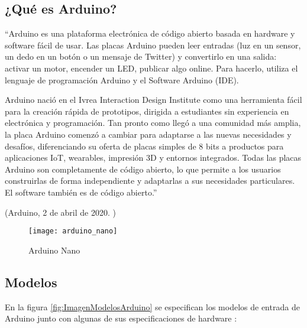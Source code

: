         \subsection{¿Qué es Arduino?} %
        \label{sub:QueEsArduino}

            ``Arduino es una plataforma electrónica de código abierto basada en hardware y software fácil de usar. Las
            placas Arduino pueden leer entradas (luz en un sensor, un dedo en un botón o un mensaje de Twitter) y
            convertirlo en una salida: activar un motor, encender un LED, publicar algo online. Para hacerlo, utiliza
            el lenguaje de programación Arduino y el Software Arduino (IDE).

            Arduino nació en el Ivrea Interaction Design Institute como una herramienta fácil para la creación rápida de
            prototipos, dirigida a estudiantes sin experiencia en electrónica y programación. Tan pronto como llegó a
            una comunidad más amplia, la placa Arduino comenzó a cambiar para adaptarse a las nuevas necesidades y
            desafíos, diferenciando su oferta de placas simples de 8 bits a productos para aplicaciones IoT, wearables,
            impresión 3D y entornos integrados. Todas las placas Arduino son completamente de código abierto, lo que
            permite a los usuarios construirlas de forma independiente y adaptarlas a sus necesidades particulares. El
            software también es de código abierto.''

            \begin{flushright}
                (Arduino, 2 de abril de 2020. \cite{arduino_introduction})
            \end{flushright}

            \begin{figure}[ht]
                \centering
                \texttt{[image: arduino\_nano]}
                \caption{Arduino Nano \cite{imagen_arduino_nano}\label{fig:ImagenArduinoNano}}
            \end{figure}


        \subsection{Modelos} %
        \label{sub:ModelosArduino}

            En la figura \ref{fig:ImagenModelosArduino} se especifican los modelos de entrada de Arduino junto con algunas de sus
            especificaciones de hardware \cite{arduino_compare}:

